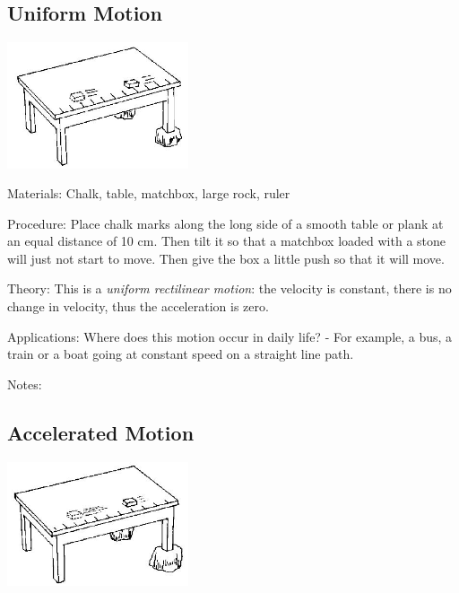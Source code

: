 \begin{multicols}{2}
\subsection{Uniform Motion}

\begin{center}
\includegraphics[width=0.4\textwidth]{./img/source/uniform.jpg}
\end{center}

\begin{description*}
\item[Materials:]{Chalk, table, matchbox, large rock, ruler}
\item[Procedure:]{Place chalk marks along the long side of a smooth table or plank at an equal distance of
10 cm. Then tilt it so that a matchbox loaded with a stone will just not start to move. Then give
the box a little push so that it will move.}
\item[Theory:]{This is a \emph{uniform rectilinear motion}: the velocity is constant, there is no change in
velocity, thus the acceleration is zero.}
\item[Applications:]{Where does this motion occur in daily life? - For example, a bus, a train or a boat going at
constant speed on a straight line path.}
\item[Notes:]{}
\end{description*}

\columnbreak

\subsection{Accelerated Motion}

\begin{center}
\includegraphics[width=0.4\textwidth]{./img/source/accelerated.jpg}
\end{center}


\end{multicols}
